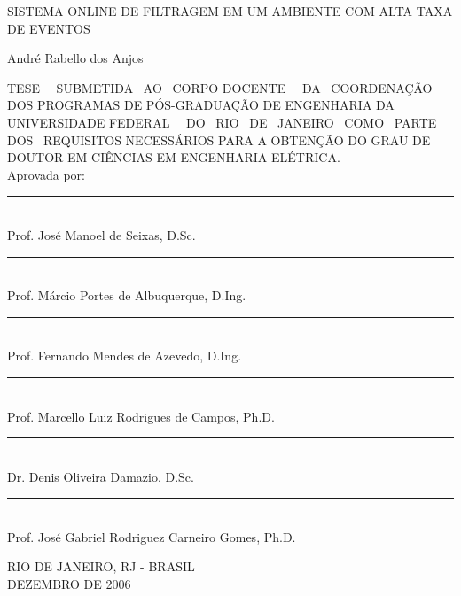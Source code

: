 \begin{titlepage}
\begin{center}
{ SISTEMA ONLINE DE FILTRAGEM EM UM AMBIENTE COM ALTA TAXA DE EVENTOS }

\vspace*{1.0cm}
{André Rabello dos Anjos}
\end{center}
\vspace*{1.0cm}

{ \noindent 
TESE~~ SUBMETIDA~ AO~ CORPO DOCENTE~~ DA~ COORDENAÇÃO~ DOS
PROGRAMAS DE PÓS-GRADUAÇÃO DE ENGENHARIA DA \mbox{UNIVERSIDADE} FEDERAL~~ DO~
RIO~ DE~ JANEIRO~ COMO~ PARTE~ DOS~ REQUISITOS \mbox{NECESSÁRIOS} PARA A
OBTENÇÃO DO GRAU DE DOUTOR EM CIÊNCIAS EM ENGENHARIA ELÉTRICA. }  \\

\noindent Aprovada por:
\vspace{1.0cm} %

\begin{flushright}
\parbox{10cm}
{
\begin{center}

\rule{10cm}{.02cm} \\
Prof. José Manoel de Seixas, D.Sc. \\
\vspace{.20in}

\rule{10cm}{.02cm} \\
Prof. Márcio Portes de Albuquerque, D.Ing.
\vspace{.20in}

\rule{10cm}{.02cm} \\
Prof. Fernando Mendes de Azevedo, D.Ing.
\vspace{.20in}

\rule{10cm}{.02cm} \\
Prof. Marcello Luiz Rodrigues de Campos, Ph.D.
\vspace{.20in}

\rule{10cm}{.02cm} \\
Dr. Denis Oliveira Damazio, D.Sc.
\vspace{.20in}

\rule{10cm}{.02cm} \\
Prof. José Gabriel Rodriguez Carneiro Gomes, Ph.D.
\vspace{.20in}

\end{center}
}
\end{flushright}
\vspace{-.5cm}

\vfill
\begin{center}
RIO DE JANEIRO, RJ - BRASIL \\
DEZEMBRO DE 2006
\end{center}

\end{titlepage}
